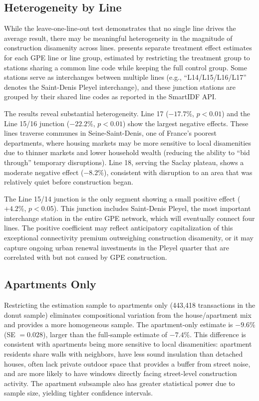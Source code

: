 \documentclass[12pt]{article}
\begin{document}
\subsection{Heterogeneity by Line}

While the leave-one-line-out test demonstrates that no single line drives the average result, there may be meaningful heterogeneity in the magnitude of construction disamenity across lines.  presents separate treatment effect estimates for each GPE line or line group, estimated by restricting the treatment group to stations sharing a common line code while keeping the full control group. Some stations serve as interchanges between multiple lines (e.g., ``L14/L15/L16/L17'' denotes the Saint-Denis Pleyel interchange), and these junction stations are grouped by their shared line codes as reported in the SmartIDF API.

The results reveal substantial heterogeneity. Line 17 ($-17.7\%$, $p < 0.01$) and the Line 15/16 junction ($-22.2\%$, $p < 0.01$) show the largest negative effects. These lines traverse communes in Seine-Saint-Denis, one of France's poorest departments, where housing markets may be more sensitive to local disamenities due to thinner markets and lower household wealth (reducing the ability to ``bid through'' temporary disruptions). Line 18, serving the Saclay plateau, shows a moderate negative effect ($-8.2\%$), consistent with disruption to an area that was relatively quiet before construction began.

The Line 15/14 junction is the only segment showing a small positive effect ($+4.2\%$, $p < 0.05$). This junction includes Saint-Denis Pleyel, the most important interchange station in the entire GPE network, which will eventually connect four lines. The positive coefficient may reflect anticipatory capitalization of this exceptional connectivity premium outweighing construction disamenity, or it may capture ongoing urban renewal investments in the Pleyel quarter that are correlated with but not caused by GPE construction.



\subsection{Apartments Only}

Restricting the estimation sample to apartments only (443,418 transactions in the donut sample) eliminates compositional variation from the house/apartment mix and provides a more homogeneous sample. The apartment-only estimate is $-9.6\%$ (SE $= 0.028$), larger than the full-sample estimate of $-7.4\%$. This difference is consistent with apartments being more sensitive to local disamenities: apartment residents share walls with neighbors, have less sound insulation than detached houses, often lack private outdoor space that provides a buffer from street noise, and are more likely to have windows directly facing street-level construction activity. The apartment subsample also has greater statistical power due to sample size, yielding tighter confidence intervals.
\end{document}

